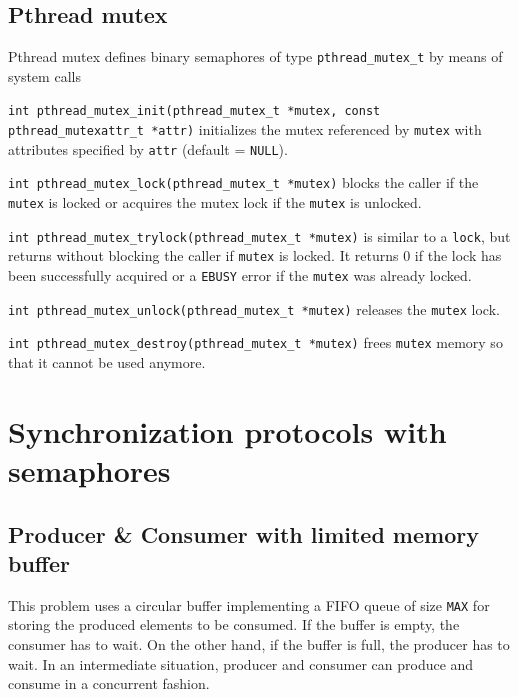 \subsection{Pthread mutex}
Pthread mutex defines binary semaphores of type \texttt{pthread\_mutex\_t} by means of system calls
\begin{description}
\item \texttt{int pthread\_mutex\_init(pthread\_mutex\_t *mutex, \newline const pthread\_mutexattr\_t *attr)} initializes the mutex referenced by \texttt{mutex} with attributes specified by \texttt{attr} (default = \texttt{NULL}).

\item \texttt{int pthread\_mutex\_lock(pthread\_mutex\_t *mutex)} blocks the caller if the \texttt{mutex} is locked or acquires the mutex lock if the \texttt{mutex} is unlocked.

\item \texttt{int pthread\_mutex\_trylock(pthread\_mutex\_t *mutex)} is similar to a \texttt{lock}, but returns without blocking the caller if \texttt{mutex} is locked. It returns 0 if the lock has been successfully acquired or a \texttt{EBUSY} error if  the \texttt{mutex} was already locked.

\item \texttt{int pthread\_mutex\_unlock(pthread\_mutex\_t *mutex)} releases the \texttt{mutex} lock.

\item \texttt{int pthread\_mutex\_destroy(pthread\_mutex\_t *mutex)} frees \texttt{mutex} memory so that it cannot be used anymore.
\end{description}

\section{Synchronization protocols with semaphores}
\subsection{Producer \& Consumer with limited memory buffer}
This problem uses a circular buffer implementing a FIFO queue of size \texttt{MAX} for storing the produced elements to be consumed. If the buffer is empty, the consumer has to wait. On the other hand, if the buffer is full, the producer has to wait. In an intermediate situation, producer and consumer can produce and consume in a concurrent fashion.

